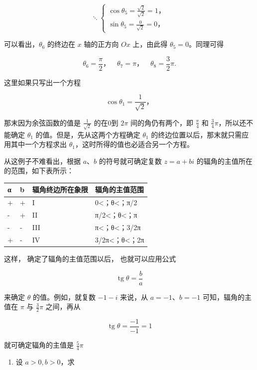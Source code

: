 \[
\ddots \left\{ \begin{array}{l} \cos \theta_ {5} = \frac {\sqrt {2}}{\sqrt {2}} = 1\text{，} \\ \sin \theta_ {5} = \frac {0}{\sqrt {2}} = 0\text{，} \end{array} \right.
\]

可以看出，\(\theta_{6}\) 的终边在 \(x\) 轴的正方向 \(Ox\) 上，由此得
\(\theta_{5} = 0\)。同理可得

\[
\theta_ {6} = \frac {\pi}{2}\text{，} \quad \theta_ {7} = \pi \text{，} \quad \theta_ {8} = \frac {3}{2} \pi .
\]

 这里如果只写出一个方程

\[
\cos \theta_ {1} = \frac {1}{\sqrt {2}}\text{，}
\]

那末因为余弦函数的值是 \(\frac{1}{\sqrt{2}}\) 的在0到 \(2\pi\)
间的角仍有两个，即 \(\frac{\pi}{4}\) 和
\(\frac{3}{4}\pi\)，所以还不能确定 \(\theta_{1}\)
的值。但是，先从这两个方程确定 \(\theta_{1}\)
的终边位置以后，那末就只需应用其中一个方程求出
\(\theta_{1}\)，这时所得的值也必适合另一个方程。

从这例子不难看出，根据 \(a\)、\(b\) 的符号就可确定复数 \(z = a + bi\)
的辐角的主值所在的范围，如下表所示：

{\def\LTcaptype{none} %
\begin{longtable}[]{@{}llll@{}}
\toprule\noalign{}
α & b & 辐角终边所在象限 & 辐角的主值范围 \\
\midrule\noalign{}
\endhead
\bottomrule\noalign{}
\endlastfoot
+ & + & I & 0\textless；θ\textless；π/2 \\
- & + & II & π/2\textless；θ\textless；π \\
- & - & III & π\textless；θ\textless；3/2π \\
+ & - & IV & 3/2π\textless；θ\textless；2π \\
\end{longtable}
}

这样， 确定了辐角的主值范围以后， 也就可以应用公式

\[
\operatorname{tg} \theta = \frac {b}{a}
\]

来确定 \(\theta\) 的值。例如，就复数 \(-1 - i\) 来说，从
\(a = -1\)、\(b = -1\) 可知，辐角的主值在 \(\pi\) 与 \(\frac{3}{2}\pi\)
之间，再从

\[
\operatorname{tg} \theta = \frac {- 1}{- 1} = 1
\]

就可确定辐角的主值是 \(\frac{5}{4}\pi\)

\begin{enumerate}
\item
  设 \(a > 0, b > 0\)，求
\end{enumerate}

